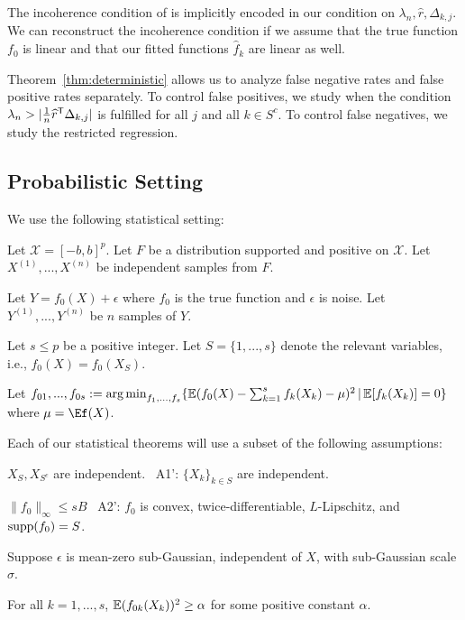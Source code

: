 \begin{remark}
  The incoherence condition of \cite{Wain:09a} is implicitly encoded
  in our condition on $\lambda_n, \hat{r}, \Delta_{k,j}$. We can
  reconstruct the incoherence condition if we assume that the true
  function $f_0$ is linear and that our fitted functions $\hat{f}_k$
  are linear as well.
\end{remark}

Theorem~\ref{thm:deterministic} allows us to analyze false negative
rates and false positive rates separately. To control false positives,
we study when the condition $\lambda_n > | \frac{1}{n} \widehat{r}^{\mathsf{T}}
\Delta_{k,j}|$ is fulfilled for all $j$ and all $k \in S^c$. To
control false negatives, we study the restricted regression.

\subsection{Probabilistic Setting}

We use the following statistical setting:

\begin{packed_enum}
\item Let $\mathcal{X} = [-b, b]^p$. Let $F$ be a distribution supported and positive on $\mathcal{X}$. Let $X^{(1)},..., X^{(n)} $ be independent samples from $F$. 
\item Let $Y = f_0(X) + \epsilon$ where $f_0$ is the true function and $\epsilon$ is noise. Let $Y^{(1)},...,Y^{(n)}$ be $n$ samples of $Y$.
\item Let $s \leq p$ be a positive integer. Let $S = \{1,...,s\}$ denote the relevant variables, i.e.,
  $f_0(X) = f_0(X_S)$.
\item Let $f_{01},...,f_{0s} := \mathop{\text{\rm arg\,min}}_{f_1,...,f_s} \{ {\mathbb E}(f_0(X) - \sum_{k=1}^s f_k(X_k) -\mu )^2 \,|\, {\mathbb E}[f_k(X_k)] = 0 \}$ where $\mu = \Ef(X)$.
\end{packed_enum}

Each of our statistical theorems will use a subset of the following assumptions:
\begin{packed_enum}
\item[A1:] $X_S, X_{S^c}$ are independent.  \ A1': $\{ X_k \}_{k \in S}$ are independent.
\item[A2:] $\|f_0\|_\infty \leq sB$ \  A2': $f_0$ is convex,
  twice-differentiable, $L$-Lipschitz, and $\textrm{supp}(f_0) = S$.
\item[A3:] Suppose $\epsilon$ is mean-zero sub-Gaussian, independent of $X$, with sub-Gaussian scale $\sigma$.
\item[A4:] For all $k=1,...,s$, ${\mathbb E}(f_{0k}(X_k))^2 \geq \alpha$ for some positive constant $\alpha$.
\end{packed_enum}

